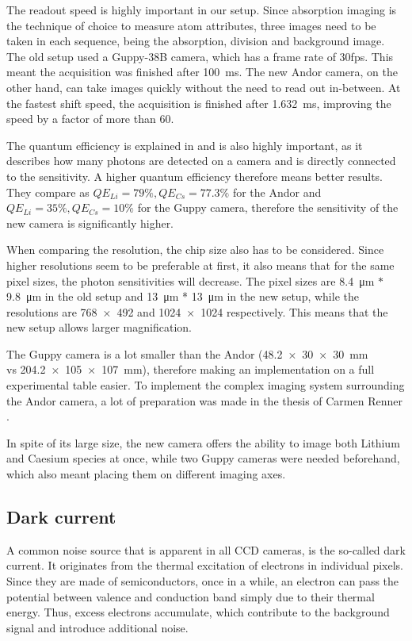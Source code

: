 The readout speed is highly important in our setup. Since absorption imaging is the technique of choice to measure atom attributes, three images need to be taken in each sequence, being the absorption, division and background image.
The old setup used a Guppy-38B \cite{Repp2013} camera, which has a frame rate of 30fps. This meant the acquisition was finished after \SI{100}{\milli\second}. The new Andor camera, on the other hand, can take images quickly without the need to read out in-between. At the fastest shift speed, the acquisition is finished after \SI{1.632}{\milli\second}, improving the speed by a factor of more than $60$.

The quantum efficiency is explained in  and is also highly important, as it describes how many photons are detected on a camera and is directly connected to the sensitivity. A higher quantum efficiency therefore means better results. They compare as $QE_{Li} = 79\%, QE_{Cs} = 77.3\%$ for the Andor and $QE_{Li} = 35\%, QE_{Cs} = 10\%$ for the Guppy camera, therefore the sensitivity of the new camera is significantly higher.

When comparing the resolution, the chip size also has to be considered. Since higher resolutions seem to be preferable at first, it also means that for the same pixel sizes, the photon sensitivities will decrease. The pixel sizes are \SI{8.4}{\micro\meter} $*$ \SI{9.8}{\micro\meter} in the old setup and \SI{13}{\micro\meter} * \SI{13}{\micro\meter} in the new setup, while the resolutions are \SI{768x492}{} and \SI{1024x1024}{} respectively. This means that the new setup allows larger magnification.

The Guppy camera is a lot smaller than the Andor (\SI{48.2x30x30}{\milli\meter} \\vs \SI{204.2x105x107}{\milli\meter}), therefore making an implementation on a full experimental table easier. To implement the complex imaging system surrounding the Andor camera, a lot of preparation was made in the thesis of Carmen Renner \cite{Renner2014}.

In spite of its large size, the new camera offers the ability to image both Lithium and Caesium species at once, while two Guppy cameras were needed beforehand, which also meant placing them on different imaging axes.

\subsection{Dark current}
\label{subsec:darkcurrent}
A common noise source that is apparent in all CCD cameras, is the so-called dark current. It originates from the thermal excitation of electrons in individual pixels. Since they are made of semiconductors, once in a while, an electron can pass the potential between valence and conduction band simply due to their thermal energy. Thus, excess electrons accumulate, which contribute to the background signal and introduce additional noise\cite{FP362011}.

